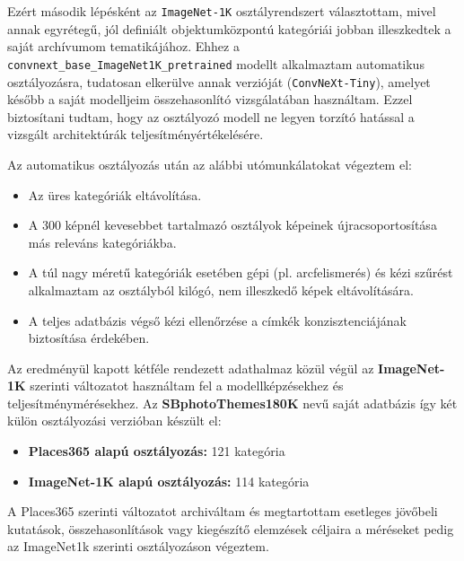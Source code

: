             Ezért második lépésként az \texttt{ImageNet-1K} osztályrendszert választottam, mivel annak egyrétegű, jól definiált objektumközpontú kategóriái jobban illeszkedtek a saját archívumom tematikájához. Ehhez a \texttt{convnext\_base\_ImageNet1K\_pretrained} modellt alkalmaztam automatikus osztályozásra, tudatosan elkerülve annak verzióját (\texttt{ConvNeXt-Tiny}), amelyet később a saját modelljeim összehasonlító vizsgálatában használtam. Ezzel biztosítani tudtam, hogy az osztályozó modell ne legyen torzító hatással a vizsgált architektúrák teljesítményértékelésére.
            
            Az automatikus osztályozás után az alábbi utómunkálatokat végeztem el:
            
            \begin{itemize}
                \item Az üres kategóriák eltávolítása.
                \item A 300 képnél kevesebbet tartalmazó osztályok képeinek újracsoportosítása más releváns kategóriákba.
                \item A túl nagy méretű kategóriák esetében gépi (pl. arcfelismerés) és kézi szűrést alkalmaztam az osztályból kilógó, nem illeszkedő képek eltávolítására.
                \item A teljes adatbázis végső kézi ellenőrzése a címkék konzisztenciájának biztosítása érdekében.
            \end{itemize}
            
            Az eredményül kapott kétféle rendezett adathalmaz közül végül az \textbf{ImageNet-1K} szerinti változatot használtam fel a modellképzésekhez és teljesítménymérésekhez. Az \textbf{SBphotoThemes180K} nevű saját adatbázis így két külön osztályozási verzióban készült el:
            
            \begin{itemize}
                \item \textbf{Places365 alapú osztályozás:} 121 kategória
                \item \textbf{ImageNet-1K alapú osztályozás:} 114 kategória
            \end{itemize}
            
            A Places365 szerinti változatot archiváltam és megtartottam esetleges jövőbeli kutatások, összehasonlítások vagy kiegészítő elemzések céljaira a méréseket pedig az ImageNet1k szerinti osztályozáson végeztem.
            

